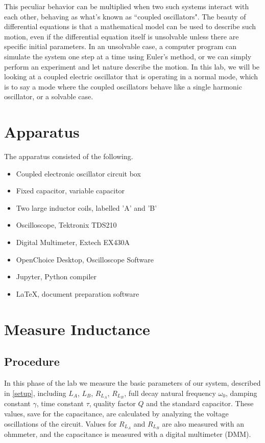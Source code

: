 \documentclass[aps,prl,reprint]{revtex4-2}
\begin{document}
This peculiar behavior can be multiplied when two such systems interact with each 
other, behaving as what's known as ``coupled oscillators". The beauty of differential
equations is that a mathematical model can be used to describe such motion, even
if the differential equation itself is unsolvable unless there are specific initial
parameters. In an unsolvable case, a computer program can simulate the system one step at a
time using Euler's method, or we can simply perform an experiment and let nature 
describe the motion. In this lab, we will be looking at a coupled electric oscillator
that is operating in a normal mode, which is to say a mode where the coupled oscillators
behave like a single harmonic oscillator, or a solvable case.




\section{Apparatus}

The apparatus consisted of the following.
\begin{itemize}
	\item Coupled electronic oscillator circuit box
	\item Fixed capacitor, variable capacitor
	\item Two large inductor coils, labelled 'A' and 'B'
	\item Oscilloscope, Tektronix TDS210 
	\item Digital Multimeter, Extech EX430A
	\item OpenChoice Desktop, Oscilloscope Software
	\item Jupyter, Python compiler
	\item LaTeX, document preparation software
\end{itemize}

\section{Measure Inductance}

\subsection{Procedure}
In this phase of the lab we measure the basic parameters of our system, described
in \ref{setup}, including $L_A$, $L_B$, $R_L_A$, $R_L_B$, full decay natural 
frequency $\omega_0$, damping constant $\gamma$, time constant $\tau$, 
quality factor $Q$ and the standard capacitor. These values, save for the capacitance,
are calculated by analyzing the voltage oscillations of the circuit. Values for $R_L_A$
and $R_L_B$ are also measured with an ohmmeter, and the capacitance is measured
with a digital multimeter (DMM). \\
\end{document}
